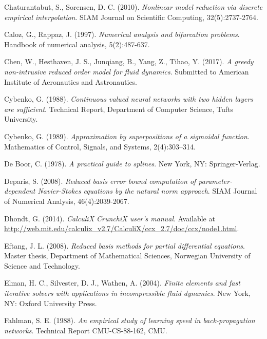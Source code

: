 \documentclass[12pt, a4paper, twoside, openright, notitlepage]{report}
\numberwithin{equation}{chapter}
\theoremstyle{theorem}
\theoremstyle{definition}
\theoremstyle{remark}
\theoremstyle{proposition}
\numberwithin{figure}{chapter}
\begin{document}
\begin{thebibliography}{50}
		Chaturantabut, S., Sorensen, D. C. (2010). \emph{Nonlinear model reduction via discrete empirical interpolation}. SIAM Journal on Scientific Computing, 32(5):2737-2764.
		
		Caloz, G., Rappaz, J. (1997). \emph{Numerical analysis and bifurcation problems}. Handbook of numerical analysis, 5(2):487-637.
		
		Chen, W., Hesthaven, J. S., Junqiang, B., Yang, Z., Tihao, Y. (2017). \emph{A greedy non-intrusive reduced order model for fluid dynamics}. Submitted to American Institute of Aeronautics and Astronautics.
	
		Cybenko, G. (1988). \emph{Continuous valued neural networks with two hidden layers are sufficient}. Technical Report, Department of Computer Science, Tufts University.
		
		Cybenko, G. (1989). \emph{Approximation by superpositions of a sigmoidal function}. Mathematics of Control, Signals, and Systems, 2(4):303–314.
		
		De Boor, C. (1978). \emph{A practical guide to splines}. New York, NY: Springer-Verlag.
		
		
		Deparis, S. (2008). \emph{Reduced basis error bound computation of parameter-dependent Navier-Stokes equations by the natural norm approach}. SIAM Journal of Numerical Analysis, 46(4):2039-2067.
		
		Dhondt, G. (2014). \emph{CalculiX CrunchiX user's manual}. Available at \url{http://web.mit.edu/calculix_v2.7/CalculiX/ccx_2.7/doc/ccx/node1.html}.
		
		Eftang, J. L. (2008). \emph{Reduced basis methods for partial differential equations}. Master thesis, Department of Mathematical Sciences, Norwegian University of Science and Technology.
		
		Elman, H. C., Silvester, D. J., Wathen, A. (2004). \emph{Finite elements and fast iterative solvers with applications in incompressible fluid dynamics}. New York, NY: Oxford University Press.
		
		Fahlman, S. E. (1988). \emph{An empirical study of learning speed in back-propagation networks}. Technical Report CMU-CS-88-162, CMU.
		

\end{thebibliography}
\end{document}
